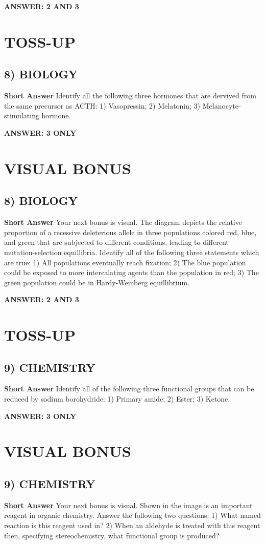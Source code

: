 \documentclass{article}
\begin{document}
\textbf{ANSWER: 2 AND 3}

\section*{TOSS-UP}
\subsection*{8) BIOLOGY}
\textbf{Short Answer} Identify all the following three hormones that are dervived from the same precursor as ACTH: 1) Vasopressin; 2) Melatonin; 3) Melanocyte-stimulating hormone.

\textbf{ANSWER: 3 ONLY}

\section*{VISUAL BONUS}
\subsection*{8) BIOLOGY}
\textbf{Short Answer} Your next bonus is visual. The diagram depicts the relative proportion of a recessive deleterious allele in three populations colored red, blue, and green that are subjected to different conditions, leading to different mutation-selection equillibria.
Identify all of the following three statements which are true: 1) All populations eventually reach fixation; 2) The blue population could be exposed to more intercalating agents than the population in red; 3) The green population could be in Hardy-Weinberg equillibrium.

\textbf{ANSWER: 2 AND 3}

\section*{TOSS-UP}
\subsection*{9) CHEMISTRY}
\textbf{Short Answer} Identify all of the following three functional groups that can be reduced by sodium borohydride: 1) Primary amide; 2) Ester; 3) Ketone.

\textbf{ANSWER: 3 ONLY}

\section*{VISUAL BONUS}
\subsection*{9) CHEMISTRY}
\textbf{Short Answer} Your next bonus is visual. Shown in the image is an important reagent in organic chemistry.
Answer the following two questions: 1) What named reaction is this reagent used in?
2) When an aldehyde is treated with this reagent then, specifying stereochemistry, what functional group is produced?
\end{document}
